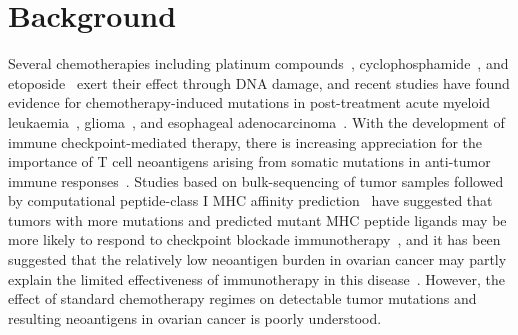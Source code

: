 \section*{Background}

Several chemotherapies including platinum compounds~\cite{Hannan_1989}, cyclophosphamide~\cite{Anderson_1995}, and etoposide~\cite{NAKANOMYO_1986} exert their effect through DNA damage, and recent studies have found evidence for chemotherapy-induced mutations in post-treatment acute myeloid leukaemia~\cite{Ding_2012}, glioma~\cite{Johnson_2013}, and esophageal adenocarcinoma~\cite{Murugaesu_2015}. With the development of immune checkpoint-mediated therapy\cite{Chen_2013}, there is increasing appreciation for the importance of T cell neoantigens arising from somatic mutations in anti-tumor immune responses~\cite{Schumacher_2015}. Studies based on bulk-sequencing of tumor samples followed by computational peptide-class I MHC affinity prediction~\cite{Lundegaard_2007} have suggested that tumors with more mutations and predicted mutant MHC peptide ligands may be more likely to respond to checkpoint blockade immunotherapy~\cite{Van_Allen_2015,Rizvi_2015}, and it has been suggested that the relatively low neoantigen burden in ovarian cancer may partly explain the limited effectiveness of immunotherapy in this disease~\cite{Martin_2016}. However, the effect of standard chemotherapy regimes on detectable tumor mutations and resulting neoantigens in ovarian cancer is poorly understood.


